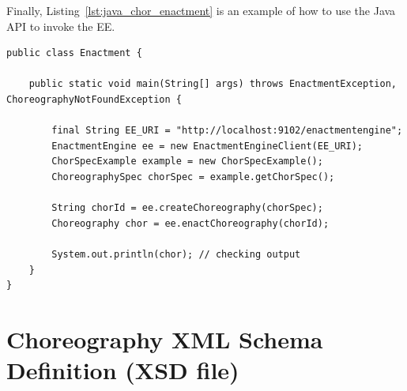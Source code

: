 Finally, Listing~\ref{lst:java_chor_enactment} is an example of how to use the Java API to invoke the EE.

{\footnotesize
\begin{lstlisting}[breaklines, caption={Deploying a choreography using the Java API.}, label={lst:java_chor_enactment}]
public class Enactment {

    public static void main(String[] args) throws EnactmentException, ChoreographyNotFoundException {

        final String EE_URI = "http://localhost:9102/enactmentengine";
        EnactmentEngine ee = new EnactmentEngineClient(EE_URI);
        ChorSpecExample example = new ChorSpecExample();
        ChoreographySpec chorSpec = example.getChorSpec();

        String chorId = ee.createChoreography(chorSpec);
        Choreography chor = ee.enactChoreography(chorId);

        System.out.println(chor); // checking output
    }
}
\end{lstlisting}
}

\section{Choreography XML Schema Definition (XSD file)}
\label{sec:xsd}


